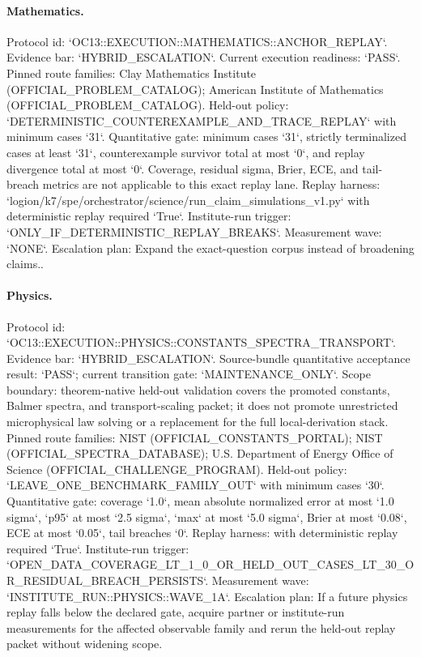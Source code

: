 \paragraph{Mathematics.}
Protocol id: `OC13::EXECUTION::MATHEMATICS::ANCHOR\_REPLAY`. Evidence bar: `HYBRID\_ESCALATION`. Current execution readiness: `PASS`.
Pinned route families: Clay Mathematics Institute (OFFICIAL\_PROBLEM\_CATALOG); American Institute of Mathematics (OFFICIAL\_PROBLEM\_CATALOG).
Held-out policy: `DETERMINISTIC\_COUNTEREXAMPLE\_AND\_TRACE\_REPLAY` with minimum cases `31`.
Quantitative gate: minimum cases `31`, strictly terminalized cases at least `31`, counterexample survivor total at most `0`, and replay divergence total at most `0`. Coverage, residual sigma, Brier, ECE, and tail-breach metrics are not applicable to this exact replay lane.
Replay harness: `logion/k7/spe/orchestrator/science/run\_claim\_simulations\_v1.py` with deterministic replay required `True`.
Institute-run trigger: `ONLY\_IF\_DETERMINISTIC\_REPLAY\_BREAKS`. Measurement wave: `NONE`.
Escalation plan: Expand the exact-question corpus instead of broadening claims..

\paragraph{Physics.}
Protocol id: `OC13::EXECUTION::PHYSICS::CONSTANTS\_SPECTRA\_TRANSPORT`. Evidence bar: `HYBRID\_ESCALATION`. Source-bundle quantitative acceptance result: `PASS`; current transition gate: `MAINTENANCE\_ONLY`. Scope boundary: theorem-native held-out validation covers the promoted constants, Balmer spectra, and transport-scaling packet; it does not promote unrestricted microphysical law solving or a replacement for the full local-derivation stack.
Pinned route families: NIST (OFFICIAL\_CONSTANTS\_PORTAL); NIST (OFFICIAL\_SPECTRA\_DATABASE); U.S. Department of Energy Office of Science (OFFICIAL\_CHALLENGE\_PROGRAM).
Held-out policy: `LEAVE\_ONE\_BENCHMARK\_FAMILY\_OUT` with minimum cases `30`.
Quantitative gate: coverage `1.0`, mean absolute normalized error at most `1.0 sigma`, `p95` at most `2.5 sigma`, `max` at most `5.0 sigma`, Brier at most `0.08`, ECE at most `0.05`, tail breaches `0`.
Replay harness:  with deterministic replay required `True`.
Institute-run trigger: `OPEN\_DATA\_COVERAGE\_LT\_1\_0\_OR\_HELD\_OUT\_CASES\_LT\_30\_OR\_RESIDUAL\_BREACH\_PERSISTS`. Measurement wave: `INSTITUTE\_RUN::PHYSICS::WAVE\_1A`.
Escalation plan: If a future physics replay falls below the declared gate, acquire partner or institute-run measurements for the affected observable family and rerun the held-out replay packet without widening scope.


